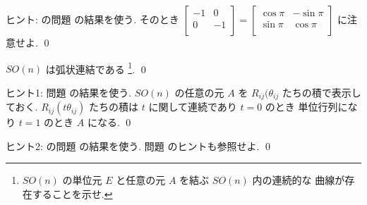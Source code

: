 \documentclass[12pt,twoside]{jarticle}
\begin{document}
\noindent
ヒント: の問題  の結果を使う.
そのとき $
\begin{bmatrix}
  -1 &  0 \\
   0 & -1 \\
\end{bmatrix}
=
\begin{bmatrix}
  \cos\pi & -\sin\pi \\
  \sin\pi &  \cos\pi \\
\end{bmatrix}$ に注意せよ. 
\qed


\begin{question}
\label{q:SO(n)-connected}
  $SO(n)$ は弧状連結である%
  \footnote{$SO(n)$ の単位元 $E$ と任意の元 $A$ を結ぶ $SO(n)$ 内の連続的な
    曲線が存在することを示せ.}.
  \qed
\end{question}

\noindent
ヒント1: 問題  の結果を使う.  
$SO(n)$ の任意の元 $A$ を $R_{ij}(\theta_{ij}$ たちの積で表示しておく. 
$R_{ij}(t\theta_{ij})$ たちの積は $t$ に関して連続であり $t=0$ のとき
単位行列になり $t=1$ のとき $A$ になる.
\qed

\medskip
\noindent
ヒント2: の問題  の結果を使う.
問題  のヒントも参照せよ.
\qed

\bigskip
\end{document}
